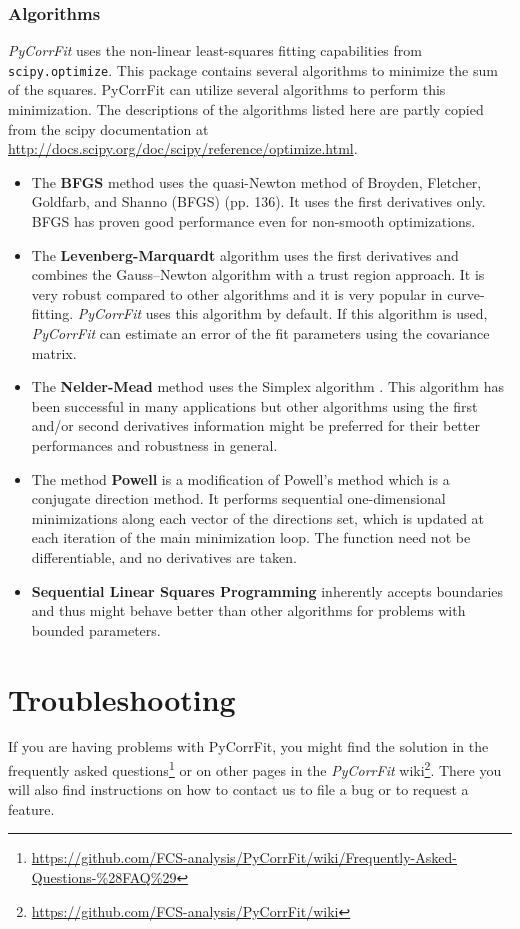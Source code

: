 \subsubsection{Algorithms}
\label{sec:theor.alg}
\textit{PyCorrFit} uses the non-linear least-squares fitting capabilities from \texttt{scipy.optimize}. This package contains several algorithms to minimize the sum of the squares. 
PyCorrFit can utilize several algorithms to perform this minimization. The descriptions of the algorithms listed here are partly copied from the scipy documentation at \url{http://docs.scipy.org/doc/scipy/reference/optimize.html}. 
\begin{itemize}
\item The \textbf{BFGS} method uses the quasi-Newton method of Broyden, Fletcher, Goldfarb, and Shanno (BFGS) \cite{Nocedal2006} (pp. 136). It uses the first derivatives only. BFGS has proven good performance even for non-smooth optimizations.
\item The \textbf{Levenberg-Marquardt} algorithm \cite{Levenberg1944} uses the first derivatives and combines the Gauss–Newton algorithm with a trust region approach. It is very robust compared to other algorithms and it is very popular in curve-fitting. \textit{PyCorrFit} uses this algorithm by default. If this algorithm is used, \textit{PyCorrFit} can estimate an error of the fit parameters using the covariance matrix.
\item The \textbf{Nelder-Mead} method uses the Simplex algorithm \cite{Nelder1965,Wright1996}. This algorithm has been successful in many applications but other algorithms using the first and/or second derivatives information might be preferred for their better performances and robustness in general.
\item The method \textbf{Powell} is a modification of Powell's method \cite{Powell1964, Press} which is a conjugate direction method. It performs sequential one-dimensional minimizations along each vector of the directions set, which is updated at each iteration of the main minimization loop. The function need not be differentiable, and no derivatives are taken.
\item \textbf{Sequential Linear Squares Programming}  inherently accepts boundaries and thus might behave better than other algorithms for problems with  bounded parameters.
\end{itemize}



\section{Troubleshooting}
If you are having problems with PyCorrFit, you might find the solution in the frequently asked questions\footnote{\url{https://github.com/FCS-analysis/PyCorrFit/wiki/Frequently-Asked-Questions-\%28FAQ\%29}} or on other pages in the \textit{PyCorrFit} 
wiki\footnote{\url{https://github.com/FCS-analysis/PyCorrFit/wiki}}.
There you will also find instructions on how to contact us to file a bug or to request a feature.
